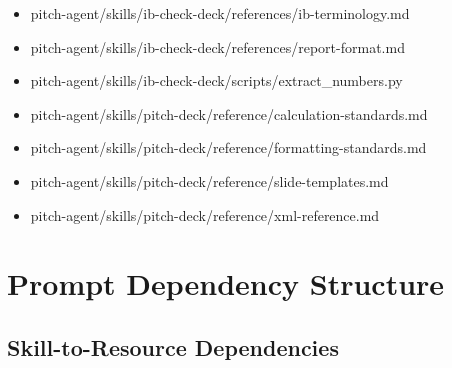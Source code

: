 \documentclass[11pt]{article}
\begin{document}
\begin{itemize}[leftmargin=*,itemsep=1pt,topsep=2pt]
\item \hspace*{3.6em}pitch-agent/skills/ib-check-deck/references/ib-terminology.md
\item \hspace*{3.6em}pitch-agent/skills/ib-check-deck/references/report-format.md
\item \hspace*{3.6em}pitch-agent/skills/ib-check-deck/scripts/extract\_\allowbreak{}numbers.py
\item \hspace*{3.6em}pitch-agent/skills/pitch-deck/reference/calculation-standards.md
\item \hspace*{3.6em}pitch-agent/skills/pitch-deck/reference/formatting-standards.md
\item \hspace*{3.6em}pitch-agent/skills/pitch-deck/reference/slide-templates.md
\item \hspace*{3.6em}pitch-agent/skills/pitch-deck/reference/xml-reference.md
\end{itemize}

\section{Prompt Dependency Structure}

\subsection{Skill-to-Resource Dependencies}
\end{document}
